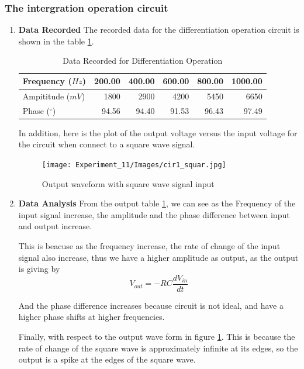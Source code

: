     \subsubsection{The intergration operation circuit}
    \begin{enumerate}[I]

        \item \textbf{Data Recorded}\newline
            The recorded data for the differentiation operation circuit is shown in the table \ref{tab:diff}.
            \begin{table}[H]
                \centering
                \begin{tabular}{l|rrrrr}
                    Frequency ($Hz$) & 200.00  & 400.00  & 600.00  & 800.00  & 1000.00  \\
                    \midrule
                    Ampititude ($mV$) & 1800  & 2900  & 4200  & 5450  & 6650  \\
                    Phase ($^\circ$) & 94.56  & 94.40  & 91.53  & 96.43  & 97.49  \\
                \end{tabular}%
                \caption{Data Recorded for Differentiation Operation}
                \label{tab:diff}
            \end{table}
            In addition, here is the plot of the output voltage versus the input voltage for the circuit when connect to a square wave signal.
            \begin{figure}[H]
                \centering
                \texttt{[image: Experiment\_11/Images/cir1\_squar.jpg]}
                \caption{Output waveform with square wave signal input}
                \label{wave:diff}
            \end{figure}

        \item \textbf{Data Analysis}\newline
            From the output table \ref{tab:diff}, we can see as the Frequency of the input signal increase, the amplitude and the phase difference between input and output increase.\par 
            
            This is beacuse as the frequency increase, the rate of change of the input signal also increase, thus we have a higher amplitude as output, as the output is giving by 
                \begin{equation*}
                    V_{out} = -RC\frac{dV_{in}}{dt}
                \end{equation*}
            \par

            And the phase difference increases because circuit is not ideal, and have a higher phase shifts at higher frequencies.\par

            Finally, with respect to the output wave form in figure \ref{wave:diff}. This is because the rate of change of the square wave is approximately infinite at its edges, so the output is a spike at the edges of the square wave.
    \end{enumerate}
